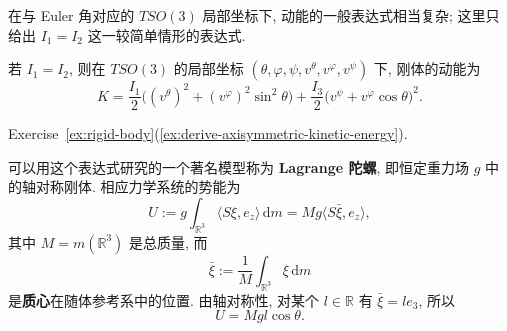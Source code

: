 在与 Euler 角对应的 $TSO(3)$ 局部坐标下, 动能的一般表达式相当复杂; 这里只给出 $I_1=I_2$ 这一较简单情形的表达式.

\begin{RiemannProposition}\label{prop:kinetic-energy-of-axisymmetric-rigid-body}
若 $I_1=I_2$, 则在 $TSO(3)$ 的局部坐标 $(\theta,\varphi,\psi,v^\theta,v^\varphi,v^\psi)$ 下, 刚体的动能为
\[
  K=\frac{I_1}{2}\bigl((v^\theta)^2+(v^\varphi)^2\sin^2\theta\bigr)
  +\frac{I_3}{2}\bigl(v^\psi+v^\varphi\cos\theta\bigr)^2.
\]
\end{RiemannProposition}

\begin{RiemannProof}
Exercise~\ref{ex:rigid-body}(\ref{ex:derive-axisymmetric-kinetic-energy}).
\end{RiemannProof}

可以用这个表达式研究的一个著名模型称为 \textbf{Lagrange 陀螺}, 即恒定重力场 $g$ 中的轴对称刚体. 相应力学系统的势能为
\[
  U:=g\int_{\mathbb{R}^3}\langle S\xi,e_z\rangle\,\mathrm{d}m
  =Mg\langle S\bar\xi,e_z\rangle,
\]
其中 $M=m(\mathbb{R}^3)$ 是总质量, 而
\[
  \bar\xi:=\frac{1}{M}\int_{\mathbb{R}^3}\xi\,\mathrm{d}m
\]
是\textbf{质心}在随体参考系中的位置. 由轴对称性, 对某个 $l\in\mathbb{R}$ 有 $\bar\xi=le_3$, 所以
\[
  U=Mgl\cos\theta.
\]

